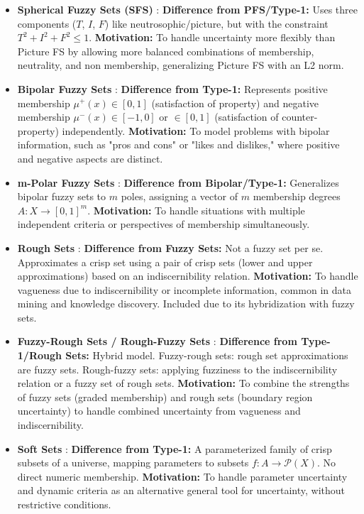 \begin{itemize}
    \item \textbf{Spherical Fuzzy Sets (SFS)} \cite{GundogduKahraman2019_Spherical}: \textbf{Difference from PFS/Type-1:} Uses three components ($T$, $I$, $F$) like neutrosophic/picture, but with the constraint $T^2 + I^2 + F^2 \leq 1$. \textbf{Motivation:} To handle uncertainty more flexibly than Picture FS by allowing more balanced combinations of membership, neutrality, and non membership, generalizing Picture FS with an L2 norm.

    \item \textbf{Bipolar Fuzzy Sets} \cite{Zhang1994_Bipolar}: \textbf{Difference from Type-1:} Represents positive membership $\mu^+(x) \in [0,1]$ (satisfaction of property) and negative membership $\mu^-(x) \in [-1,0]$ or $\in [0,1]$ (satisfaction of counter-property) independently. \textbf{Motivation:} To model problems with bipolar information, such as "pros and cons" or "likes and dislikes," where positive and negative aspects are distinct.

    \item \textbf{m-Polar Fuzzy Sets} \cite{Chen2014_mPolar}: \textbf{Difference from Bipolar/Type-1:} Generalizes bipolar fuzzy sets to $m$ poles, assigning a vector of $m$ membership degrees $A: X \to [0,1]^m$. \textbf{Motivation:} To handle situations with multiple independent criteria or perspectives of membership simultaneously.

    \item \textbf{Rough Sets} \cite{Pawlak1982_Rough}: \textbf{Difference from Fuzzy Sets:} Not a fuzzy set per se. Approximates a crisp set using a pair of crisp sets (lower and upper approximations) based on an indiscernibility relation. \textbf{Motivation:} To handle vagueness due to indiscernibility or incomplete information, common in data mining and knowledge discovery. Included due to its hybridization with fuzzy sets.

    \item \textbf{Fuzzy-Rough Sets / Rough-Fuzzy Sets} \cite{DuboisPrade1990_FuzzyRough}: \textbf{Difference from Type-1/Rough Sets:} Hybrid model. Fuzzy-rough sets: rough set approximations are fuzzy sets. Rough-fuzzy sets: applying fuzziness to the indiscernibility relation or a fuzzy set of rough sets. \textbf{Motivation:} To combine the strengths of fuzzy sets (graded membership) and rough sets (boundary region uncertainty) to handle combined uncertainty from vagueness and indiscernibility.

    \item \textbf{Soft Sets} \cite{Molodtsov1999_Soft}: \textbf{Difference from Type-1:} A parameterized family of crisp subsets of a universe, mapping parameters to subsets $f: A \to \mathcal{P}(X)$. No direct numeric membership. \textbf{Motivation:} To handle parameter uncertainty and dynamic criteria as an alternative general tool for uncertainty, without restrictive conditions.


\end{itemize}
